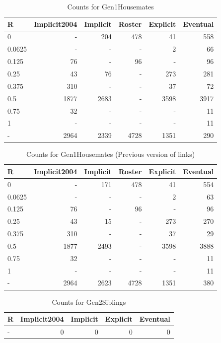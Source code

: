 \documentclass[a4paper]{article}\usepackage{graphicx, color}
\begin{document}
\begin{table}[ht]
\centering
{\large
\begin{tabular}{lrrrrr}
  \hline
R & Implicit2004 & Implicit & Roster & Explicit & Eventual \\ 
  \hline
0 & - & 204 & 478 &  41 & 558 \\ 
  0.0625 & - & - & - &   2 &  66 \\ 
  0.125 &  76 & - &  96 & - &  96 \\ 
  0.25 &  43 &  76 & - & 273 & 281 \\ 
  0.375 & 310 & - & - &  37 &  72 \\ 
  0.5 & 1877 & 2683 & - & 3598 & 3917 \\ 
  0.75 &  32 & - & - & - &  11 \\ 
  1 & - & - & - & - &  11 \\ 
  - & 2964 & 2339 & 4728 & 1351 & 290 \\ 
   \hline
\end{tabular}
}
\caption{Counts for Gen1Housemates} 
\end{table}
\begin{table}[ht]
\centering
{\large
\begin{tabular}{lrrrrr}
  \hline
R & Implicit2004 & Implicit & Roster & Explicit & Eventual \\ 
  \hline
0 & - & 171 & 478 &  41 & 554 \\ 
  0.0625 & - & - & - &   2 &  63 \\ 
  0.125 &  76 & - &  96 & - &  96 \\ 
  0.25 &  43 &  15 & - & 273 & 270 \\ 
  0.375 & 310 & - & - &  37 &  29 \\ 
  0.5 & 1877 & 2493 & - & 3598 & 3888 \\ 
  0.75 &  32 & - & - & - &  11 \\ 
  1 & - & - & - & - &  11 \\ 
  - & 2964 & 2623 & 4728 & 1351 & 380 \\ 
   \hline
\end{tabular}
}
\caption{Counts for Gen1Housemates (Previous version of links)} 
\end{table}
\begin{table}[ht]
\centering
{\large
\begin{tabular}{lrrrr}
  \hline
R & Implicit2004 & Implicit & Explicit & Eventual \\ 
  \hline
- &   0 &   0 &   0 &   0 \\ 
   \hline
\end{tabular}
}
\caption{Counts for Gen2Siblings} 
\end{table}
\end{document}
